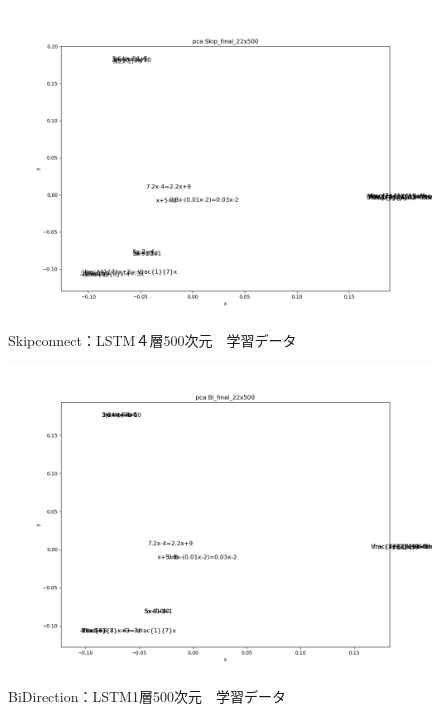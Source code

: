 \documentclass[a4j,11pt,report]{jsbook}
\begin{document}
\begin{center}
  \begin{figure}[tb]
    \centering
    \includegraphics[width=0.7\linewidth]{result/pca_formula_Skip_final_22x500_4_Wed_Feb_06_06:47:59.png}
    \caption{Skipconnect：LSTM４層500次元　学習データ}
    \label{fig:Skip4layer}
  \end{figure}
\end{center}


\begin{center}
  \begin{figure}[tb]
    \centering
    \includegraphics[width=0.7\linewidth]{result/pca_formula_Bi_final_22x500_1_Wed_Feb_06_06:26:57.png}
    \caption{BiDirection：LSTM1層500次元　学習データ}
    \label{fig:Bi500layer1}
  \end{figure}
\end{center}
\end{document}
